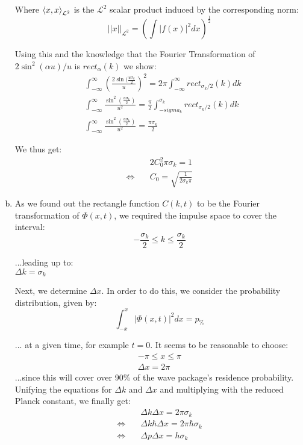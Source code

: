 \documentclass[a4paper,german,12pt,smallheadings]{scrartcl}
\begin{document}
\begin{enumerate}[a)]
Where $\braket{x,x}_{\mathcal{L}^2}$ is the $\mathcal{L}^2$ scalar product induced by the corresponding norm:
\begin{equation*}
||x||_{\mathcal{L}^2}=\left(\int|f(x)|^2dx\right)^{\frac{1}{2}}
\end{equation*}

Using this and the knowledge that the Fourier Transformation of $2\sin^2(\alpha u)/u$ is $rect_{\alpha}(k)$ we show:
\begin{align*}
&\int_{-\infty}^{\infty}\left(\frac{2\sin(\frac{u\sigma_k}{2}}{u}\right)^2=2\pi\int_{-\infty}^{\infty}rect_{\sigma_k/2}(k)dk\\
&\int_{-\infty}^{\infty}\frac{\sin^2(\frac{u\sigma_k}{2})}{u^2}=\frac{\pi}{2}\int_{-sigma_k}^{\sigma_k}rect_{\sigma_k/2}(k)dk\\
&\int_{-\infty}^{\infty}\frac{\sin^2(\frac{u\sigma_k}{2})}{u^2}=\frac{\pi\sigma_k}{2}
\end{align*}

We thus get:
\begin{align*}
& 2C_0^2\pi\sigma_k=1\\
\Leftrightarrow \quad & C_0=\sqrt{\frac{1}{2\sigma_k\pi}}
\end{align*}

\item 
As we found out the rectangle function $C(k,t)$ to be the Fourier transformation of $\Phi(x,t)$, we required the impulse space to cover the interval:
\begin{equation*}
-\frac{\sigma_k}{2}\le k\le\frac{\sigma_k}{2}
\end{equation*}
\begin{center}
...leading up to:\\
$\Delta k=\sigma_k$
\end{center}

Next, we determine $\Delta x$. In order to do this, we consider the probability distribution, given by:
\begin{equation*}
\int_{-x}^{x}|\Phi(x,t)|^2dx=p_{\%}
\end{equation*}

... at a given time, for example $t=0$. It seems to be reasonable to choose:
\begin{align*}
-\pi\le x \le \pi\\
\Delta x =2\pi
\end{align*}
...since this will cover over 90\% of the wave package's residence probability. Unifying the equations for $\Delta k$ and $\Delta x$ and multiplying with the reduced Planck constant, we finally get:
\begin{align*}
&\Delta k \Delta x=2\pi\sigma_k\\
\Leftrightarrow \quad &\Delta k \hbar \Delta x=2\pi\hbar\sigma_k\\
\Leftrightarrow \quad &\Delta p \Delta x=h\sigma_k
\end{align*}


\end{enumerate}
\end{document}
